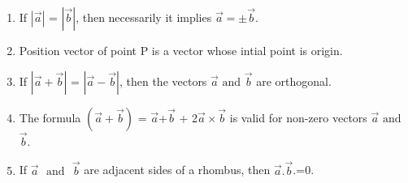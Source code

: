 \documentclass{article}
\providecommand{\abs}[1]{\left\vert#1\right\vert}
\begin{document}
\begin{enumerate}
\item If $\abs{\vec{a}}$ = $\abs{\vec{b}}$, then necessarily it implies $\vec{a}=\pm\vec{b}$.


\item Position vector of point P is a vector whose intial point is origin.


\item If $\abs{\vec{a}+\vec{b}}$ = $\abs{\vec{a}-\vec{b}}$, then the vectors $\vec{a}$ $\text {and}$ $\vec{b}$ are orthogonal.


\item The formula $(\vec{a}+\vec{b})$ = $\vec{a}$+$\vec{b}$ + 2$\vec{a}\times\vec{b}$ is valid for non-zero vectors $\vec{a}$ $\text{and}$ $\vec{b}$.


\item If $\vec{a}$ $\text{ and }$ $\vec{b}$ are adjacent sides of a rhombus, then $\vec{a}.\vec{b}$.=0.
	\end{enumerate}
\end{document}
